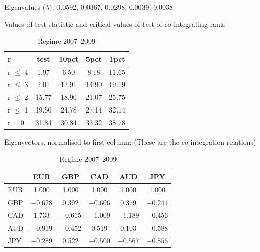 	\begin{table}[!ht]
	\caption{Regime 2007--2009 \label{tab:fulldur2}}
	\centering
	Eigenvalues ($\lambda$): 0.0592, 0.0367, 0.0298, 0.0039, 0.0038

	Values of test statistic and critical values of test of co-integrating rank: \\[0.1cm]
	
	\begin{tabular}{| l | c | c | c | c |} \hline
	r               &  test & 10pct & 5pct & 1pct\\ \hline
	r $\leq$ 4 &  1.97  & 6.50 &  8.18 & 11.65\\ \hline
	r $\leq$ 3 &  2.01 & 12.91 & 14.90 & 19.19\\ \hline
	r $\leq$ 2 & 15.77 & 18.90 & 21.07 & 25.75\\ \hline
	r $\leq$ 1 & 19.50 & 24.78 & 27.14 & 32.14\\ \hline
	r = 0  & 31.84 & 30.84 & 33.32 & 38.78
	\end{tabular}

	Eigenvectors, normalised to first column: (These are the co-integration relations) \\[0.1cm]
	
	\begin{tabular}{| l | c | c | c | c | c |} \hline
	         &  EUR  &   GBP  &   CAD   &  AUD  &   JPY \\ \hline
	EUR & 1.000 & 1.000 & 1.000 & 1.000 & 1.000 \\ \hline
	GBP & $-0.628$ & 0.392 & $-0.606$ & 0.379 & $-0.241$ \\ \hline
	CAD & 1.733 & $-0.615$ & $-1.009$ & $-1.189$ & $-0.456$ \\ \hline
	AUD & $-0.919$ & $-0.452$  & 0.519  & 0.103 & $-0.588$ \\ \hline
	JPY & $-0.289$  & 0.522 & $-0.500$ & $-0.567$ & $-0.856$
	\end{tabular}
	\end{table}
	
